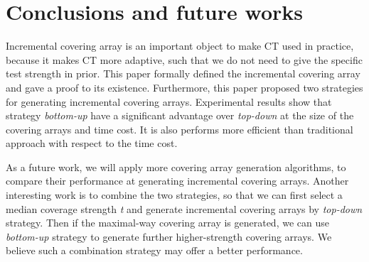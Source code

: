 \documentclass[conference]{IEEEtran}
\theoremstyle{definition}
\begin{document}
\section{Conclusions and future works}
Incremental covering array is an important object to make CT used in practice, because it makes CT more adaptive, such that we do not need to give the specific test strength in prior. This paper formally defined the incremental covering array and gave a proof to its existence. Furthermore, this paper proposed two strategies for generating incremental covering arrays. Experimental results show that strategy \emph{bottom-up} have a significant advantage over \emph{top-down} at the size of the covering arrays and time cost. It is also performs more efficient than traditional approach with respect to the time cost.

As a future work, we will apply more covering array generation algorithms, to compare their performance at generating incremental covering arrays. Another interesting work is to combine the two strategies, so that we can first select a median coverage strength \emph{t} and generate incremental covering arrays by \emph{top-down} strategy. Then if the maximal-way covering array is generated, we can use \emph{bottom-up} strategy to generate further higher-strength covering arrays. We believe such a combination strategy may offer a better performance.
%
%

\end{document}
